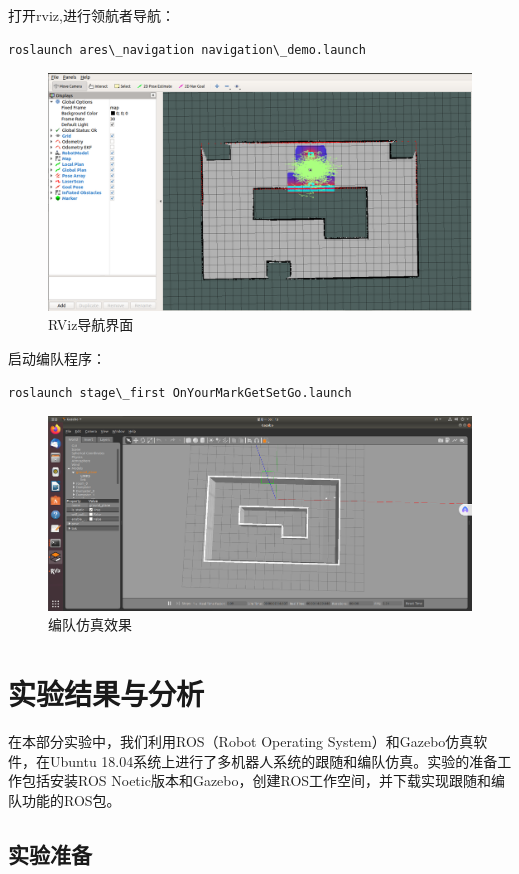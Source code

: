 \documentclass[journal,twoside,web]{ieeecolor}
\begin{document}
打开rviz,进行领航者导航：
\begin{lstlisting}
roslaunch ares\_navigation navigation\_demo.launch
\end{lstlisting}

\begin{figure}[H]
    \centering
    \includegraphics[width=0.8\linewidth]{img/2.jpg}
    \caption{RViz导航界面}
\end{figure}

启动编队程序：
\begin{lstlisting}
roslaunch stage\_first OnYourMarkGetSetGo.launch
\end{lstlisting}

\begin{figure}[H]
    \centering
    \includegraphics[width=0.8\linewidth]{img/3.jpg}
    \caption{编队仿真效果}
\end{figure}

\section{实验结果与分析}
 
在本部分实验中，我们利用ROS（Robot Operating System）和Gazebo仿真软件，在Ubuntu 18.04系统上进行了多机器人系统的跟随和编队仿真。实验的准备工作包括安装ROS Noetic版本和Gazebo，创建ROS工作空间，并下载实现跟随和编队功能的ROS包。
 
\subsection*{实验准备}
\end{document}
